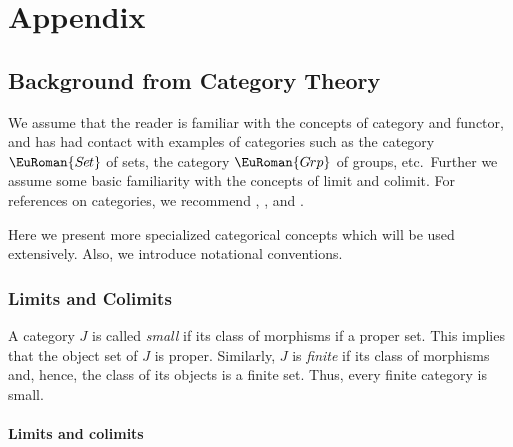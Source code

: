 \documentclass [12pt,oneside]{book}%
\theoremstyle{captionstyle}  %
\newcommand{\Defn}[1]{\emph{#1}}
\newcommand{\Sets}{\EuRoman{S{\kern-0.12ex}e{\hskip-0.14ex}t}}			                       %
\newcommand{\Grps}{\EuRoman{G{\kern -.15ex}rp}}				%
\begin{document}
\appendix
\part[Appendix]{Appendix}

\noindent

\chapter[Background from Category Theory]{Background from Category Theory}
\label{chap:Categorical-Preliminaries}%

We assume that the reader is familiar with the concepts of category and functor, and has had contact with examples of categories such as the category $\Sets$ of sets, the category $\Grps$ of groups, etc.\ Further we assume some basic familiarity with the concepts of limit and colimit. For references on categories, we recommend \cite{SMacLane1998}, \cite{AHS:Cats}, and \cite{Borceux:Cats1,Borceux:Cats2}.

Here we present more specialized categorical concepts which will be used extensively. Also, we introduce notational conventions.

\section[Limits and Colimits]{Limits and Colimits}
\label{sec:Limits-CoLimits}%

A category $J$ is called \Defn{small} if its class of morphisms if a proper set. This implies that the object set of $J$ is proper. Similarly, $J$ is \Defn{finite} if its class of morphisms and, hence, the class of its objects is a finite set. Thus, every finite category is small. %
%
%

\subsection{Limits and colimits}
\label{subsec:Limits/Colimits}
\end{document}
